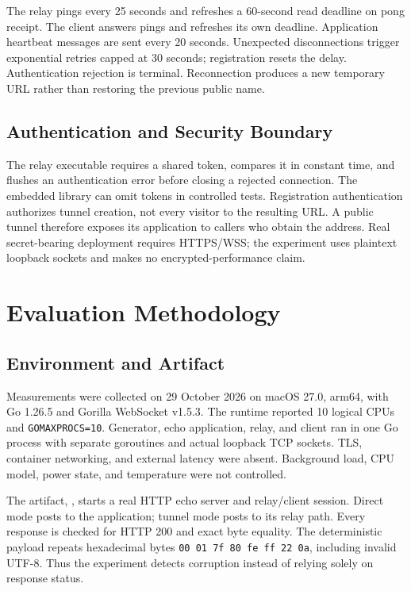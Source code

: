 \documentclass[conference,letterpaper]{IEEEtran}
\newcommand{\code}[1]{\texttt{#1}}
\begin{document}
The relay pings every 25 seconds and refreshes a 60-second read deadline on
pong receipt. The client answers pings and refreshes its own deadline.
Application heartbeat messages are sent every 20 seconds. Unexpected
disconnections trigger exponential retries capped at 30 seconds; registration
resets the delay. Authentication rejection is terminal. Reconnection produces
a new temporary URL rather than restoring the previous public name.

\subsection{Authentication and Security Boundary}
The relay executable requires a shared token, compares it in constant time,
and flushes an authentication error before closing a rejected connection.
The embedded library can omit tokens in controlled tests. Registration
authentication authorizes tunnel creation, not every visitor to the resulting
URL. A public tunnel therefore exposes its application to callers who obtain
the address. Real secret-bearing deployment requires HTTPS/WSS; the experiment
uses plaintext loopback sockets and makes no encrypted-performance claim.

\section{Evaluation Methodology}
\subsection{Environment and Artifact}
Measurements were collected on 29 October 2026 on macOS 27.0, arm64, with Go
1.26.5 and Gorilla WebSocket v1.5.3. The runtime reported 10 logical CPUs and
\code{GOMAXPROCS=10}. Generator, echo application, relay, and client ran in one
Go process with separate goroutines and actual loopback TCP sockets. TLS,
container networking, and external latency were absent. Background load, CPU
model, power state, and temperature were not controlled.

The artifact, , starts a real HTTP echo server
and relay/client session. Direct mode posts to the application; tunnel mode
posts to its relay path. Every response is checked for HTTP 200 and exact byte
equality. The deterministic payload repeats hexadecimal bytes
\code{00 01 7f 80 fe ff 22 0a}, including invalid UTF-8. Thus the experiment
detects corruption instead of relying solely on response status.
\end{document}
